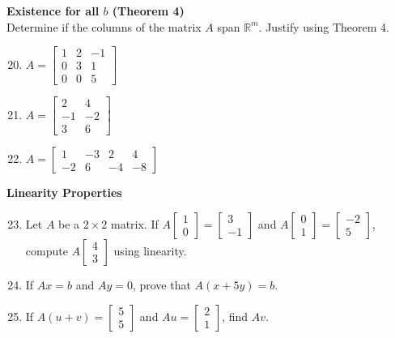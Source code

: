 \documentclass[12pt]{article}
\begin{document}
\textbf{Existence for all $b$ (Theorem 4)} \\
Determine if the columns of the matrix $A$ span $\mathbb{R}^m$. Justify using Theorem 4.
\begin{enumerate}
\setcounter{enumi}{19}
    \item $A = \begin{bmatrix} 1 & 2 & -1 \\ 0 & 3 & 1 \\ 0 & 0 & 5 \end{bmatrix}$
    \item $A = \begin{bmatrix} 2 & 4 \\ -1 & -2 \\ 3 & 6 \end{bmatrix}$
    \item $A = \begin{bmatrix} 1 & -3 & 2 & 4 \\ -2 & 6 & -4 & -8 \end{bmatrix}$
\end{enumerate}

\textbf{Linearity Properties}
\begin{enumerate}
\setcounter{enumi}{22}
    \item Let $A$ be a $2 \times 2$ matrix. If $A\begin{bmatrix} 1 \\ 0 \end{bmatrix} = \begin{bmatrix} 3 \\ -1 \end{bmatrix}$ and $A\begin{bmatrix} 0 \\ 1 \end{bmatrix} = \begin{bmatrix} -2 \\ 5 \end{bmatrix}$, compute $A\begin{bmatrix} 4 \\ 3 \end{bmatrix}$ using linearity.
    \item If $Ax = b$ and $Ay = 0$, prove that $A(x + 5y) = b$.
    \item If $A(u+v) = \begin{bmatrix} 5 \\ 5 \end{bmatrix}$ and $Au = \begin{bmatrix} 2 \\ 1 \end{bmatrix}$, find $Av$.
\end{enumerate}
\end{document}
